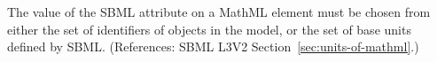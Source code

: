 The value of the SBML attribute  on a MathML 
element must be chosen from either the set of identifiers of
\UnitDefinition objects in the model, or the set of base units defined by
SBML.  (References: SBML L3V2 Section~\ref{sec:units-of-mathml}.)

